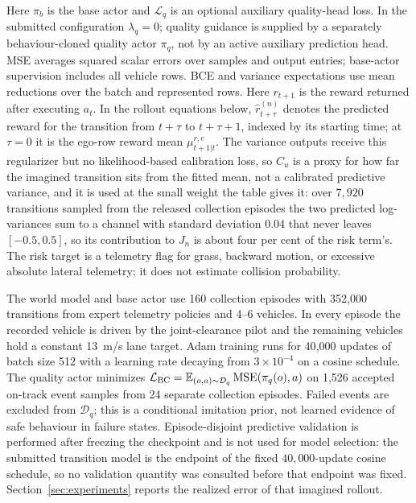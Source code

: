 \documentclass[journal]{IEEEtran}
\begin{document}
Here $\pi_b$ is the base actor and $\mathcal L_q$ is an optional auxiliary
quality-head loss. In the submitted configuration $\lambda_q=0$; quality
guidance is supplied by a separately behaviour-cloned quality actor $\pi_q$,
not by an active auxiliary prediction head. MSE averages squared scalar
errors over samples and output entries; base-actor supervision includes all
vehicle rows. BCE and variance expectations use mean reductions over the
batch and represented rows. Here $r_{t+1}$ is the reward returned after
executing $a_t$. In the rollout equations below, $\hat r_{t+\tau}^{(n)}$
denotes the predicted reward for the transition from $t+\tau$ to
$t+\tau+1$, indexed by its starting time; at $\tau=0$ it is the ego-row
reward mean $\mu_{t+1|t}^{r,e}$.
The variance outputs receive this regularizer but no likelihood-based
calibration loss, so $C_u$ is a proxy for how far the imagined transition sits
from the fitted mean, not a calibrated predictive variance, and it is used at
the small weight the table gives it: over $7{,}920$ transitions sampled from the
released collection episodes the two predicted log-variances sum to a channel
with standard deviation $0.04$ that never leaves $[-0.5,0.5]$, so its
contribution to $J_n$ is about four per cent of the risk term's. The risk target
is a telemetry flag for grass, backward motion, or excessive absolute lateral
telemetry; it does not estimate collision probability.

The world model and base actor use 160 collection episodes with 352,000
transitions from expert telemetry policies and 4--6 vehicles. In every episode
the recorded vehicle is driven by the joint-clearance pilot and the remaining vehicles
hold a constant 13~m/s lane target. Adam training
runs for 40{,}000 updates of batch size 512 with a learning rate decaying from
$3\times10^{-4}$ on a cosine schedule.
The quality actor minimizes
$\mathcal L_{\rm BC}=\mathbb E_{(o,a)\sim\mathcal D_q}\operatorname{MSE}(\pi_q(o),a)$
on 1,526 accepted on-track event samples from 24 separate collection
episodes. Failed events are excluded from $\mathcal D_q$; this is a
conditional imitation prior, not learned evidence of safe behaviour in failure
states. Episode-disjoint predictive validation is performed after freezing the
checkpoint and is not used for model selection: the submitted transition model is
the endpoint of the fixed $40{,}000$-update cosine schedule, so no validation
quantity was consulted before that endpoint was fixed. Section~\ref{sec:experiments}
reports the realized error of that imagined rollout.
\end{document}
